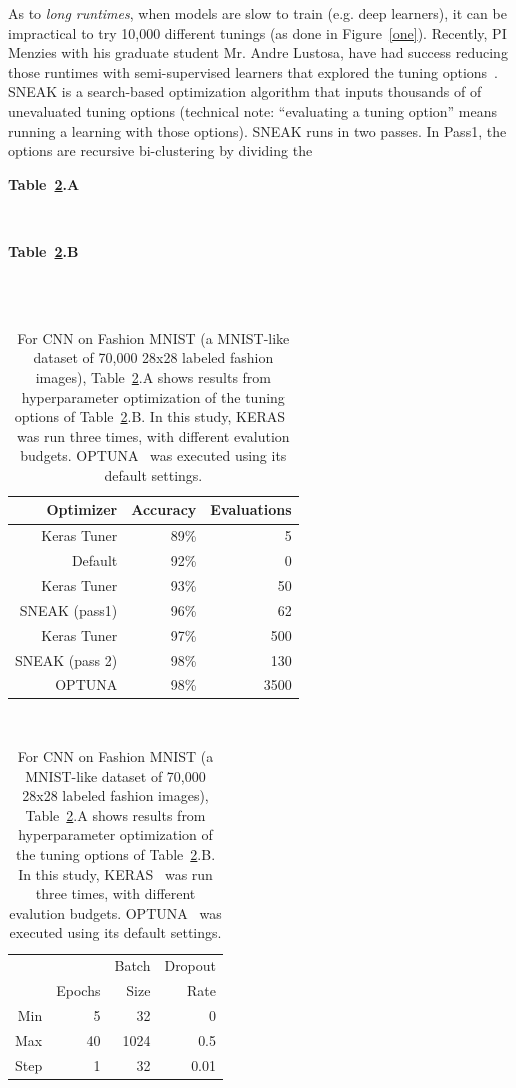 As to {\em long runtimes}, when models are slow to train (e.g. deep learners), it can be impractical
to try 10,000 different tunings (as done in   Figure~\ref{one}). Recently, PI Menzies with his graduate student
Mr. Andre Lustosa, have had   success reducing those runtimes
with semi-supervised learners that explored the tuning options~\cite{lustosa22,lustosa2021preference}.   
SNEAK is a search-based optimization algorithm that inputs thousands of of unevaluated tuning options
(technical note: ``evaluating a tuning option'' means running a learning with those options). 
 SNEAK runs in two passes. In Pass1,   the options are
recursive bi-clustering  by  dividing the 
\begin{table}
\footnotesize
\begin{minipage}{2.5in}
 \hspace{1in} {\bf Table~\ref{cnn1}.A}
\end{minipage}~~\begin{minipage}{1.5in}
  \hspace{.6in} {\bf Table~\ref{cnn1}.B }
\end{minipage}\\~\\
\begin{minipage}{2.5in}
 \begin{tabular}{r|rr}
\rowcolor{blue!10} Optimizer	&Accuracy&	Evaluations\\\hline
Keras Tuner	&89\%&	5\\
Default	&92\%	&0\\
Keras Tuner	&93\%	&50\\
 SNEAK (pass1)&	96\%&	62\\
Keras Tuner&	97\%&	500\\
 SNEAK (pass 2)&	98\%&	130\\
OPTUNA&	98\%	&3500
\end{tabular}
\end{minipage}~~\begin{minipage}{1.5in}
\begin{tabular}{r@{~}|r@{~}|r@{~}|r}
\rowcolor{blue!10}  &	& Batch  	& Dropout  \\ 
\rowcolor{blue!10} &Epochs &	  Size	&   Rate\\\hline
Min &	5&	32	&0\\
Max&	40&	1024&	0.5\\
Step	&1	&32	&0.01\\
\end{tabular}
~\\~\\~\\
\end{minipage} 


 
\caption{For CNN on   Fashion MNIST
(a MNIST-like dataset of 70,000 28x28 labeled fashion images),  Table~\ref{cnn1}.A shows results from hyperparameter optimization of the tuning options of Table~\ref{cnn1}.B. In this study, KERAS~\cite{chollet2015keras} was run three times, with different evalution budgets. OPTUNA~\cite{akiba2019optuna} was executed using its default settings.}\label{cnn1}
\end{table}
